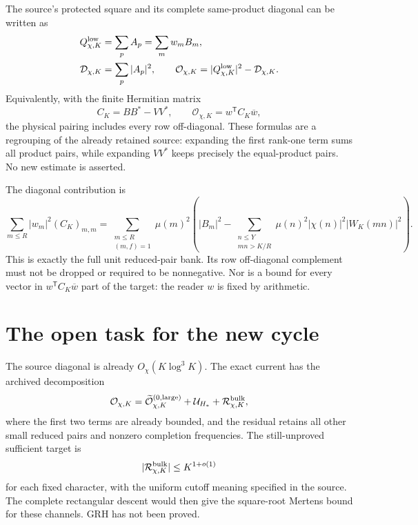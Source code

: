 \documentclass[11pt]{article}
\theoremstyle{remark}
\begin{document}
The source's protected square and its complete same-product diagonal
can be written as
\begin{align}
 Q^{\rm low}_{\chi,K}&=\sum_p A_p=\sum_m w_m B_m,
 \label{eq:c3v1-Q}\\
 \mathcal D_{\chi,K}&=\sum_p|A_p|^2,\qquad
 \mathcal O_{\chi,K}=|Q^{\rm low}_{\chi,K}|^2-\mathcal D_{\chi,K}.
 \label{eq:c3v1-DO}
\end{align}
Equivalently, with the finite Hermitian matrix
\begin{equation}
 C_K=BB^*-VV^*,\qquad
 \mathcal O_{\chi,K}=w^{\mathsf T}C_K\overline w,
 \label{eq:c3v1-coupled}
\end{equation}
the physical pairing includes every row off-diagonal.  These formulas
are a regrouping of the already retained source: expanding the first
rank-one term sums all product pairs, while expanding \(VV^*\)
keeps precisely the equal-product pairs.  No new estimate is asserted.

The diagonal contribution is
\[
 \sum_{m\le R}|w_m|^2(C_K)_{m,m}
 =\sum_{\substack{m\le R\\(m,f)=1}}
     \mu(m)^2\left(|B_m|^2-
         \sum_{\substack{n\le Y\\mn>K/R}}
                   \mu(n)^2|\chi(n)|^2|W_K(mn)|^2\right).
\]
This is exactly the full unit reduced-pair bank.  Its row off-diagonal
complement must not be dropped or required to be nonnegative.
Nor is a bound for every vector in \(w^{\mathsf T}C_K\overline w\)
part of the target: the reader \(w\) is fixed by arithmetic.

\section{The open task for the new cycle}
\label{sec:c3v1-open}

The source diagonal is already \(O_\chi(K\log^3 K)\).  The exact
current has the archived decomposition
\[
 \mathcal O_{\chi,K}
 =\widetilde{\mathcal O}^{(0,\mathrm{large})}_{\chi,K}
     +\mathcal U_{H_*}+\mathcal R_{\chi,K}^{\rm bulk},
\]
where the first two terms are already bounded, and the residual retains
all other small reduced pairs and nonzero completion frequencies.
The still-unproved sufficient target is
\[
 |\mathcal R_{\chi,K}^{\rm bulk}|\le K^{1+o(1)}
\]
for each fixed character, with the uniform cutoff meaning specified
in the source.  The complete rectangular descent would then give the
square-root Mertens bound for these channels.  GRH has not been proved.
\end{document}
